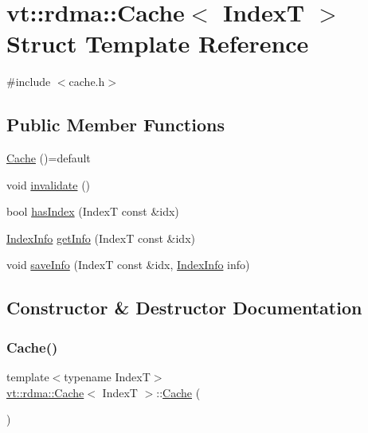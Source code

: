 \hypertarget{structvt_1_1rdma_1_1_cache}{}\section{vt\+:\+:rdma\+:\+:Cache$<$ IndexT $>$ Struct Template Reference}
\label{structvt_1_1rdma_1_1_cache}


{\ttfamily \#include $<$cache.\+h$>$}

\subsection*{Public Member Functions}
\begin{DoxyCompactItemize}
\item 
\hyperlink{structvt_1_1rdma_1_1_cache_aa3a350f584218e55c6f31ad51a47d594}{Cache} ()=default
\item 
void \hyperlink{structvt_1_1rdma_1_1_cache_a855d0107608982399063f2ad1760862b}{invalidate} ()
\item 
bool \hyperlink{structvt_1_1rdma_1_1_cache_ab67a0c4c650e06a0581a6ddd41a5313b}{has\+Index} (IndexT const \&idx)
\item 
\hyperlink{structvt_1_1rdma_1_1_index_info}{Index\+Info} \hyperlink{structvt_1_1rdma_1_1_cache_a104e7024e31f8c145e12c0e98e6593d0}{get\+Info} (IndexT const \&idx)
\item 
void \hyperlink{structvt_1_1rdma_1_1_cache_ab8f9bc1877a3be2f277e7280f3db1075}{save\+Info} (IndexT const \&idx, \hyperlink{structvt_1_1rdma_1_1_index_info}{Index\+Info} info)
\end{DoxyCompactItemize}


\subsection{Constructor \& Destructor Documentation}
\mbox{\label{structvt_1_1rdma_1_1_cache_aa3a350f584218e55c6f31ad51a47d594}} 
\subsubsection{\texorpdfstring{Cache()}{Cache()}}
{\footnotesize\ttfamily template$<$typename IndexT$>$ \\
\hyperlink{structvt_1_1rdma_1_1_cache}{vt\+::rdma\+::\+Cache}$<$ IndexT $>$\+::\hyperlink{structvt_1_1rdma_1_1_cache}{Cache} (\begin{DoxyParamCaption}{ }\end{DoxyParamCaption})\hspace{0.3cm}{\ttfamily [default]}}



